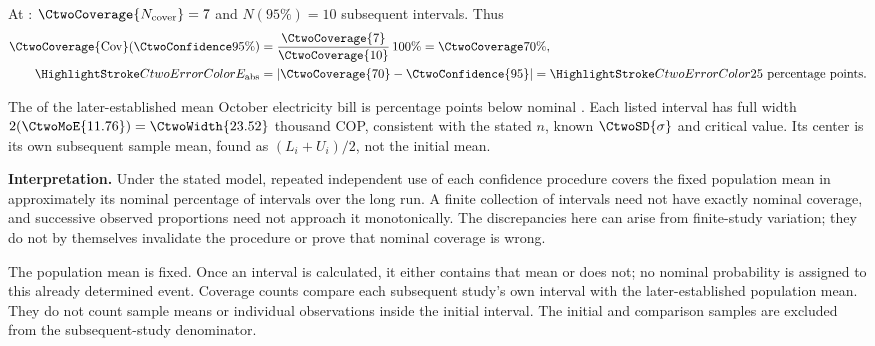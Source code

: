At : $\CtwoCoverage{N_{\mathrm{cover}}}=7$ and $N(95\%)=10$ subsequent intervals. Thus
\[\begin{aligned}
\CtwoCoverage{\mathrm{Cov}}(\CtwoConfidence{95\%})&=\frac{\CtwoCoverage{7}}{\CtwoCoverage{10}}\,100\%=\CtwoCoverage{70\%},\\
\CtwoError{E_{\mathrm{abs}}}&=|\CtwoCoverage{70}-\CtwoConfidence{95}|=\CtwoError{25}\text{ percentage points}.
\end{aligned}\]

The  of the later-established mean October electricity bill is  percentage points below nominal . Each listed interval has full width $2(\CtwoMoE{11.76})=\CtwoWidth{23.52}$ thousand COP, consistent with the stated $n$, known $\CtwoSD{\sigma}$ and critical value. Its center is its own subsequent sample mean, found as $(L_i+U_i)/2$, not the initial mean.

\textbf{Interpretation.} Under the stated model, repeated independent use of each confidence procedure covers the fixed population mean in approximately its nominal percentage of intervals over the long run. A finite collection of intervals need not have exactly nominal coverage, and successive observed proportions need not approach it monotonically. The discrepancies here can arise from finite-study variation; they do not by themselves invalidate the procedure or prove that nominal coverage is wrong.

The population mean is fixed. Once an interval is calculated, it either contains that mean or does not; no nominal probability is assigned to this already determined event. Coverage counts compare each subsequent study's own interval with the later-established population mean. They do not count sample means or individual observations inside the initial interval. The initial and comparison samples are excluded from the subsequent-study denominator.

\secInicio[][sec:p1]

\clearpage

